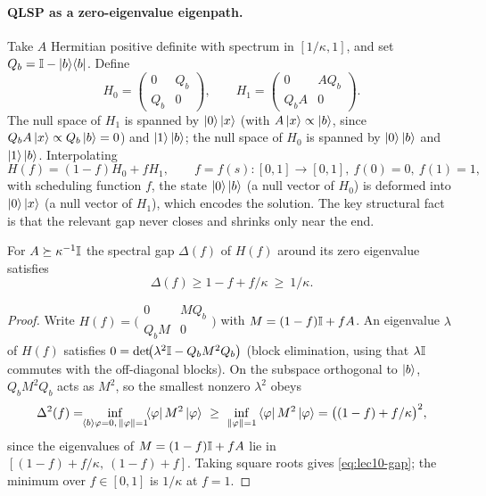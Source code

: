 \paragraph{QLSP as a zero-eigenvalue eigenpath.}
Take $A$ Hermitian positive definite with spectrum in $[1/\kappa,1]$, and set
$Q_b=\mathbb{I}-\ket{b}\!\bra{b}$. Define
\begin{equation}
  H_0=\begin{pmatrix}0&Q_b\\ Q_b&0\end{pmatrix},\qquad
  H_1=\begin{pmatrix}0&A Q_b\\ Q_b A&0\end{pmatrix}.
  \label{eq:lec10-H0H1}
\end{equation}
The null space of $H_1$ is spanned by $\ket0\ket x$ (with $A\ket x\propto\ket b$, since
$Q_b A\ket x\propto Q_b\ket b=0$) and $\ket1\ket b$; the null space of $H_0$ is spanned
by $\ket0\ket b$ and $\ket1\ket b$. Interpolating
\begin{equation}
  H(f)=(1-f)H_0+f H_1,\qquad f=f(s)\colon[0,1]\to[0,1],\ f(0)=0,\ f(1)=1,
  \label{eq:lec10-Hf}
\end{equation}
with scheduling function $f$, the state $\ket0\ket b$ (a null vector of $H_0$) is
deformed into $\ket0\ket x$ (a null vector of $H_1$), which encodes the solution. The
key structural fact is that the relevant gap never closes and shrinks only near the
end.

\begin{lemma}
\label{lem:lec10-gap}
For $A\succeq\kappa^{-1}\mathbb{I}$ the spectral gap $\Delta(f)$ of $H(f)$ around its
zero eigenvalue satisfies
\begin{equation}
  \Delta(f)\ge 1-f+f/\kappa\ \ge\ 1/\kappa.
  \label{eq:lec10-gap}
\end{equation}
\end{lemma}

\begin{proof}
Write $H(f)=\bigl(\begin{smallmatrix}0&M Q_b\\ Q_b M&0\end{smallmatrix}\bigr)$ with
$M=(1-f)\mathbb{I}+fA$. An eigenvalue $\lambda$ of $H(f)$ satisfies
$0=\det\!\bigl(\lambda^2\mathbb{I}-Q_b M^2 Q_b\bigr)$ (block elimination, using that $\lambda\mathbb{I}$
commutes with the off-diagonal blocks). On the subspace orthogonal to $\ket b$,
$Q_b M^2 Q_b$ acts as $M^2$, so the smallest nonzero $\lambda^2$ obeys
\begin{equation}
  \Delta^2(f)=\!\!\inf_{\braket{b}{\varphi}=0,\,\left\lVert \varphi \right\rVert=1}\!\!
    \bra\varphi M^2\ket\varphi
    \ \ge\ \inf_{\left\lVert \varphi \right\rVert=1}\bra\varphi M^2\ket\varphi
    =\bigl((1-f)+f/\kappa\bigr)^2,
  \label{eq:lec10-gap-pf}
\end{equation}
since the eigenvalues of $M=(1-f)\mathbb{I}+fA$ lie in $[(1-f)+f/\kappa,\ (1-f)+f]$. Taking
square roots gives \eqref{eq:lec10-gap}; the minimum over $f\in[0,1]$ is $1/\kappa$ at
$f=1$.
\end{proof}

